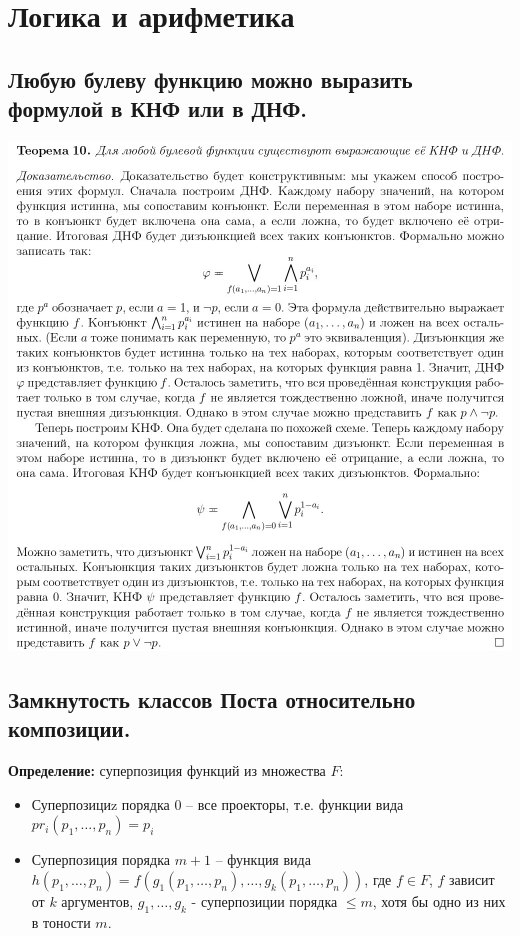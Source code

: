 \setcounter{section}{0}
\section{Логика и арифметика}

\subsection{Любую булеву функцию можно выразить формулой в КНФ или в ДНФ.}

\begin{center}
    \includegraphics[width=0.95\linewidth]{images/1_propositions_knf}
\end{center}

\subsection{Замкнутость классов Поста относительно композиции.}

\textbf{Определение:} суперпозиция функций из множества $F$:
\begin{itemize}
    \item Суперпозициz порядка 0 -- все проекторы, т.е. функции вида $pr_i(p_1,\ldots,p_n)=p_i$
    \item Суперпозиция порядка $m+1$ -- функция вида $h(p_1,\ldots,p_n)=f(g_1(p_1,\ldots,p_n),\ldots,g_k(p_1,\ldots,p_n))$, где $f\in F$, $f$ зависит от $k$ аргументов, $g_1,\ldots,g_k$ - суперпозиции порядка $\leqslant m$, хотя бы одно из них в тоности $m$.
\end{itemize}

